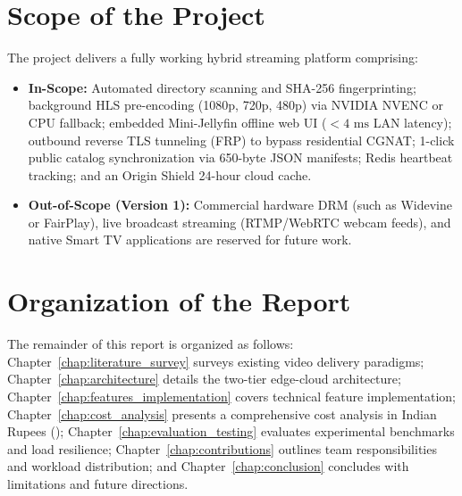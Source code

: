 \section{Scope of the Project}
\label{sec:scope}

The project delivers a fully working hybrid streaming platform comprising:
\begin{itemize}
    \item \textbf{In-Scope:} Automated directory scanning and SHA-256 fingerprinting; background HLS pre-encoding (1080p, 720p, 480p) via NVIDIA NVENC or CPU fallback; embedded Mini-Jellyfin offline web UI ($< 4\text{ ms}$ LAN latency); outbound reverse TLS tunneling (FRP) to bypass residential CGNAT; 1-click public catalog synchronization via 650-byte JSON manifests; Redis heartbeat tracking; and an Origin Shield 24-hour cloud cache.
    \item \textbf{Out-of-Scope (Version 1):} Commercial hardware DRM (such as Widevine or FairPlay), live broadcast streaming (RTMP/WebRTC webcam feeds), and native Smart TV applications are reserved for future work.
\end{itemize}

\section{Organization of the Report}
\label{sec:organization}

The remainder of this report is organized as follows: Chapter~\ref{chap:literature_survey} surveys existing video delivery paradigms; Chapter~\ref{chap:architecture} details the two-tier edge-cloud architecture; Chapter~\ref{chap:features_implementation} covers technical feature implementation; Chapter~\ref{chap:cost_analysis} presents a comprehensive cost analysis in Indian Rupees (\rupee); Chapter~\ref{chap:evaluation_testing} evaluates experimental benchmarks and load resilience; Chapter~\ref{chap:contributions} outlines team responsibilities and workload distribution; and Chapter~\ref{chap:conclusion} concludes with limitations and future directions.
